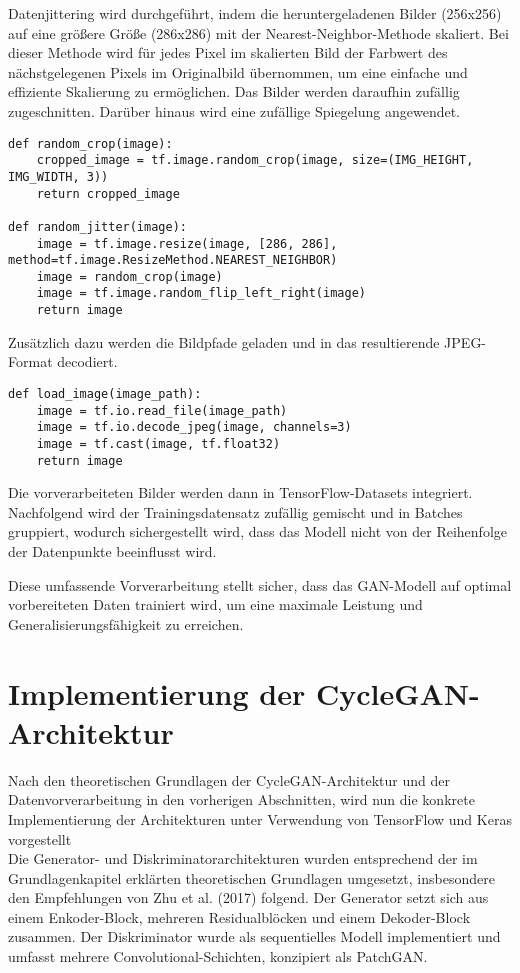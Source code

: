 Datenjittering wird durchgeführt, indem die heruntergeladenen Bilder (256x256) auf eine größere Größe (286x286) mit der Nearest-Neighbor-Methode skaliert. Bei dieser Methode wird für jedes Pixel im skalierten Bild der Farbwert des nächstgelegenen Pixels im Originalbild übernommen, um eine einfache und effiziente Skalierung zu ermöglichen. Das Bilder werden daraufhin zufällig zugeschnitten. Darüber hinaus wird eine zufällige Spiegelung angewendet.

\begin{lstlisting}[language=pyhaff, caption={Vorverarbeitung des Datensatzes: Jittering}, label={cod:jittering}]
def random_crop(image):
    cropped_image = tf.image.random_crop(image, size=(IMG_HEIGHT, IMG_WIDTH, 3))
    return cropped_image

def random_jitter(image):
    image = tf.image.resize(image, [286, 286], method=tf.image.ResizeMethod.NEAREST_NEIGHBOR)
    image = random_crop(image)
    image = tf.image.random_flip_left_right(image)
    return image
\end{lstlisting}

Zusätzlich dazu werden die Bildpfade geladen und in das resultierende JPEG-Format decodiert.

\begin{lstlisting}[language=pyhaff, caption={Vorverarbeitung des Datensatzes: Jittering}, label={cod:jittering}]
def load_image(image_path):
    image = tf.io.read_file(image_path)
    image = tf.io.decode_jpeg(image, channels=3)
    image = tf.cast(image, tf.float32)
    return image
\end{lstlisting}

Die vorverarbeiteten Bilder werden dann in TensorFlow-Datasets integriert. Nachfolgend wird der Trainingsdatensatz zufällig gemischt und in Batches gruppiert, wodurch sichergestellt wird, dass das Modell nicht von der Reihenfolge der Datenpunkte beeinflusst wird.
\newpage 


Diese umfassende Vorverarbeitung stellt sicher, dass das GAN-Modell auf optimal vorbereiteten Daten trainiert wird, um eine maximale Leistung und Generalisierungsfähigkeit zu erreichen.


\section{Implementierung der CycleGAN-Architektur}
Nach den theoretischen Grundlagen der CycleGAN-Architektur und der Datenvorverarbeitung in den vorherigen Abschnitten, wird nun die konkrete Implementierung der Architekturen unter Verwendung von TensorFlow und Keras vorgestellt 
\\
Die Generator- und Diskriminatorarchitekturen wurden entsprechend der im Grundlagenkapitel erklärten theoretischen Grundlagen umgesetzt, insbesondere den Empfehlungen von Zhu et al. (2017)\cite{Zhu.2017} folgend. Der Generator setzt sich aus einem Enkoder-Block, mehreren Residualblöcken und einem Dekoder-Block zusammen. Der Diskriminator wurde als sequentielles Modell implementiert und umfasst mehrere Convolutional-Schichten, konzipiert als PatchGAN.

